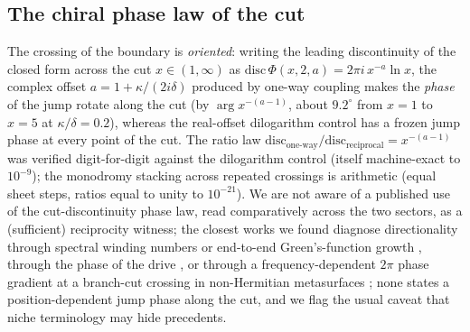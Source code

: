 \documentclass[11pt,a4paper]{article}
\begin{document}
\subsection{The chiral phase law of the cut}
\label{sec:chiral}

The crossing of the boundary is
\emph{oriented}: writing the leading discontinuity of the closed form
across the cut $x \in (1,\infty)$ as
$\mathrm{disc}\,\Phi(x,2,a) = 2\pi i\, x^{-a} \ln x$, the complex offset
$a = 1 + \kappa/(2i\delta)$ produced by one-way coupling makes the
\emph{phase} of the jump rotate along the cut (by
$\arg x^{-(a-1)}$, about $9.2^\circ$ from $x=1$ to $x=5$ at
$\kappa/\delta = 0.2$), whereas the real-offset dilogarithm control has a
frozen jump phase at every point of the cut. The ratio law
$\mathrm{disc}_{\text{one-way}}/\mathrm{disc}_{\text{reciprocal}}
= x^{-(a-1)}$ was verified digit-for-digit against the dilogarithm
control (itself machine-exact to $10^{-9}$); the monodromy stacking
across repeated crossings is arithmetic (equal sheet steps, ratios equal
to unity to $10^{-21}$). We are not aware of a published use of the
cut-discontinuity phase law, read comparatively across the two sectors, as a
(sufficient) reciprocity witness; the closest works
we found diagnose directionality through spectral winding numbers or
end-to-end Green's-function growth \cite{HuWang2023}, through the phase
of the drive \cite{McDonald2018}, or through a frequency-dependent
$2\pi$ phase gradient at a branch-cut crossing in non-Hermitian
metasurfaces \cite{Colom2023}; none states a position-dependent jump
phase along the cut, and we flag the usual caveat that niche
terminology may hide precedents.
\end{document}
